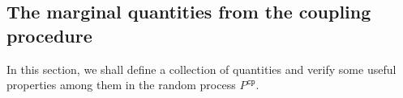\documentclass[11pt]{article}
\newtheorem{lemma}[theorem]{Lemma}
\newtheorem{corollary}[theorem]{Corollary}
\def\!#1{\mathtt{#1}}
\newcommand{\qgl}[1]{{\color{purple}{#1}}}
\newcommand{\hktodo}[1]{{\color{blue}{#1}}}
\begin{document}


%
%
%

\subsection{The marginal quantities from the coupling procedure}

\hktodo{polish the following paragraph}

In this section, we shall define a collection of quantities and verify some useful properties among them in the random process $P^{\!{cp}}$. 
\end{document}
